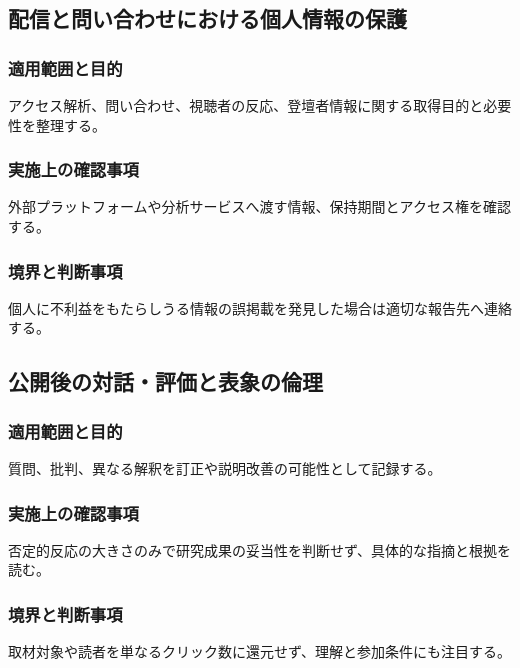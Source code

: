 \documentclass[a4paper,11pt]{article}
\begin{document}
\subsection{配信と問い合わせにおける個人情報の保護}
\subsubsection{適用範囲と目的}
\par アクセス解析、問い合わせ、視聴者の反応、登壇者情報に関する取得目的と必要性を整理する。\par\medskip
\subsubsection{実施上の確認事項}
\par 外部プラットフォームや分析サービスへ渡す情報、保持期間とアクセス権を確認する。\par\medskip
\subsubsection{境界と判断事項}
\par 個人に不利益をもたらしうる情報の誤掲載を発見した場合は適切な報告先へ連絡する。\par\medskip
\subsection{公開後の対話・評価と表象の倫理}
\subsubsection{適用範囲と目的}
\par 質問、批判、異なる解釈を訂正や説明改善の可能性として記録する。\par\medskip
\subsubsection{実施上の確認事項}
\par 否定的反応の大きさのみで研究成果の妥当性を判断せず、具体的な指摘と根拠を読む。\par\medskip
\subsubsection{境界と判断事項}
\par 取材対象や読者を単なるクリック数に還元せず、理解と参加条件にも注目する。\par\medskip
\end{document}
